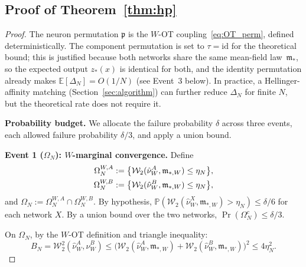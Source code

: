\documentclass[11pt]{article}
\newcommand{\E}{\mathbb{E}}
\newcommand{\Prob}{\mathbb{P}}
\newcommand{\cW}{\mathcal{W}}
\newcommand{\nperm}{\mathfrak{p}}  %
\begin{document}
\subsection{Proof of Theorem~\ref{thm:hp}}
\begin{proof}
The neuron permutation $\nperm$ is the $W$-OT coupling~\eqref{eq:OT_perm},
defined deterministically.
The component permutation is set to $\tau = \mathrm{id}$
for the theoretical bound; this is justified because both networks
share the same mean-field law~$\mathfrak{m}_*$, so the expected
output $z_*(x)$ is identical for both, and the identity permutation
already makes $\E[\Delta_N] = O(1/N)$ (see Event~3 below).
In practice, a Hellinger-affinity matching
(Section~\ref{sec:algorithm}) can further reduce $\Delta_N$
for finite $N$, but the theoretical rate does not require it.

\textbf{Probability budget.}
We allocate the failure probability $\delta$ across three events,
each allowed failure probability $\delta/3$, and apply a union bound.

\textbf{Event 1 ($\Omega_N$): $W$-marginal convergence.}
Define
\begin{align}\label{eq:event_def}
  \Omega_{N}^{W,A}
    &:= \bigl\{\cW_2(\hat\nu_W^A,\mathfrak{m}_{*,W}) \le \eta_N\bigr\},
    \notag\\
  \Omega_{N}^{W,B}
    &:= \bigl\{\cW_2(\hat\nu_W^B,\mathfrak{m}_{*,W}) \le \eta_N\bigr\},
\end{align}
and $\Omega_N := \Omega_N^{W,A} \cap \Omega_N^{W,B}$.
By hypothesis,
$\Prob(\cW_2(\hat\nu_W^X,\mathfrak{m}_{*,W}) > \eta_N) \le \delta/6$
for each network $X$.
By a union bound over the two networks,
$\Pr(\Omega_N^c) \le \delta/3$.

On $\Omega_N$, by the $W$-OT definition and triangle inequality:
\begin{equation}\label{eq:W_OT_rate}
  B_N = \cW_2^2(\hat\nu_W^A,\hat\nu_W^B)
  \le \bigl(\cW_2(\hat\nu_W^A,\mathfrak{m}_{*,W})
           +\cW_2(\hat\nu_W^B,\mathfrak{m}_{*,W})\bigr)^2
  \le 4\eta_N^2.
\end{equation}


\end{proof}
\end{document}
